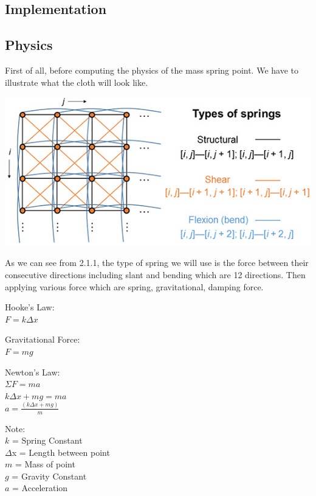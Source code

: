 \documentclass{article}
\begin{document}
\begin{multicols}{2}
\columnbreak
\section{Implementation}
\subsection{Physics}
First of all, before computing the physics of the mass spring point. We have to illustrate what the cloth will look like.

\includegraphics[width=\linewidth]{MassSpringPoint}
\newline

\justifying
As we can see from 2.1.1, the type of spring we will use is the force between their consecutive directions including slant and bending which are 12 directions. Then applying various force which are spring, gravitational, damping force.\newline

\raggedright Hooke's Law:\\
\centering $F = k\Delta x$\\
\raggedright Gravitational Force:\\
\centering $F = mg$\\
\raggedright Newton's Law:\\
\centering 
$\Sigma F = ma$\\
$k\Delta x + mg = ma$\\
$a = \frac{(k\Delta x + mg)}{m}$

\raggedright
Note:\\
$k$ = Spring Constant\\
$\Delta$x = Length between point\\
$m$ = Mass of point\\
$g$ = Gravity Constant\\
$a$ = Acceleration\newline


\end{multicols}
\end{document}
